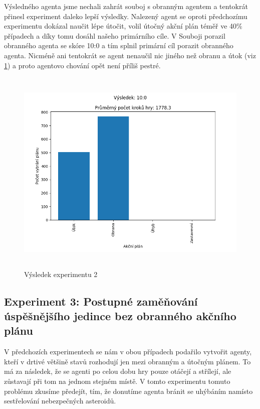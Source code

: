 Výsledného agenta jsme nechali zahrát souboj s obranným agentem a tentokrát přinesl experiment daleko lepší výsledky.
Nalezený agent se oproti předchozímu experimentu dokázal naučit lépe útočit, volil útočný akční plán téměř ve 40\% případech a díky tomu dosáhl našeho primárního cíle. V Souboji porazil obranného agenta se skóre 10:0 a tím splnil primární cíl porazit obranného agenta.
Nicméně ani tentokrát se agent nenaučil nic jiného než obranu a útok (viz \ref{Výsledek experimentu 02}) a proto agentovo chování opět není příliš pestré. 

\newpage

 


\begin{figure}[H]\centering
\includegraphics[width=125mm, height=100mm]{./Obrazky/Experiment02Results.png}
\caption{Výsledek experimentu 2}
\label{Výsledek experimentu 02}
\end{figure}




\newpage
\subsection{Experiment 3: Postupné zaměňování úspěšnějšího jedince bez obranného akčního plánu}

V předchozích experimentech se nám v obou případech podařilo vytvořit agenty, kteří v drtivé většině stavů rozhodují jen mezi obranným a útočným plánem.
To má za následek, že se agenti po celou dobu hry pouze otáčejí a střílejí, ale zůstavají při tom na jednom stejném místě.
V tomto experimentu tomuto problému zkusíme předejít, tím, že donutíme agenta bránit se uhýbáním namísto sestřelování nebezpečných asteroidů.

